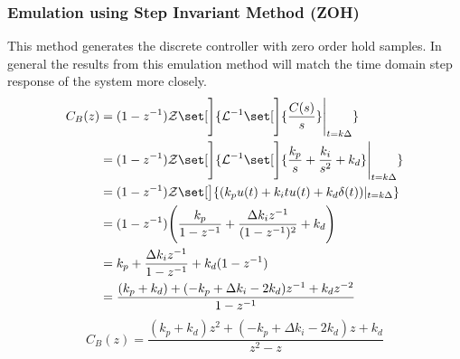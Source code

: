 \documentclass[11pt]{article}
\DeclarePairedDelimiter\set\{\}
\begin{document}
\subsubsection{Emulation using Step Invariant Method (ZOH)}
This method generates the discrete controller with zero order hold samples. In general the results from this emulation method will match the time domain step response of the system more closely.
\begin{align*}
    C_B(z) &= (1 - z^{-1}) \mathcal{Z} \set[\Bigg]{ \mathcal{L}^{-1} \set[\Bigg]{\frac{C(s)}{s} } \Biggr|_{t=k\Delta} }\\
    &= (1 - z^{-1}) \mathcal{Z} \set[\Bigg]{ \mathcal{L}^{-1} \set[\Bigg]{\frac{k_p}{s} + \frac{k_i}{s^2} + k_d} \Biggr|_{t=k\Delta} }\\
    &= (1 - z^{-1}) \mathcal{Z} \set[\big]{ ( k_p u(t) + k_i t u(t) + k_d \delta (t) )   |_{t=k\Delta}}\\
    &= (1 - z^{-1}) \Biggr( \frac{k_p}{1 - z^{-1}} + \frac{\Delta k_i z^{-1}}{(1 - z^{-1})^2} + k_d \Biggr)\\
    &= k_p + \frac{\Delta k_i z^{-1}}{1 - z^{-1}} + k_d (1 - z^{-1})\\
    &= \frac{(k_p + k_d) + (-k_p + \Delta k_i - 2 k_d)z^{-1} + k_d z^{-2}}{1 - z^{-1}}
\end{align*}
\begin{equation}\label{eq:CBz}
    C_B(z)= \frac{(k_p + k_d)z^2 + (-k_p + \Delta k_i - 2 k_d)z + k_d}{z^2 - z}
\end{equation}
\end{document}
